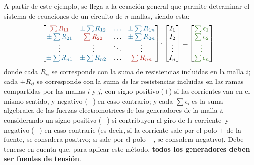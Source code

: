 	A partir de este ejemplo, se llega a la ecuación general que
        permite determinar el sistema de ecuaciones de un circuito de
        $n$ mallas, siendo esta:
	\begin{equation*}
          \begin{bmatrix}
            {\color{BrickRed}\sum R_{11}} &  {\color{MidnightBlue}\pm\sum R_{12}} & {\color{MidnightBlue}{\dots}} & {\color{MidnightBlue}\pm\sum R_{1n}} \\
            {\color{MidnightBlue}\pm\sum R_{21}} & {\color{BrickRed}\sum R_{22}} & {{\dots}} & {\color{MidnightBlue}\pm\sum R_{2n}} \\
            {\vdots} & {\vdots} &  {\ddots} & \vdots\\
            {\color{MidnightBlue}\pm\sum R_{n1}} & {\color{MidnightBlue}\pm\sum R_{n2}} & \dots & {\color{BrickRed}\sum R_{nn}}
          \end{bmatrix} \cdot 
          \begin{bmatrix}
            I_1\\
            I_2\\
            \vdots\\
            I_n
          \end{bmatrix} = %
          \begin{bmatrix}
            {\color{OliveGreen}\sum\epsilon_1}\\
            {\color{OliveGreen}\sum\epsilon_2}\\
            {\color{OliveGreen}\vdots}\\
            {\color{OliveGreen}\sum\epsilon_n}
          \end{bmatrix}
	\end{equation*}
	donde cada {\color{BrickRed}$R_{ii}$} se corresponde con la
        suma de resistencias incluidas en la malla $i$; cada
        {\color{MidnightBlue}$\pm R_{ij}$} se corresponde con la suma de las
        resistencias incluidas en las ramas compartidas por las mallas
        $i$ y $j$, con signo positivo ($+$) si las corrientes van en
        el mismo sentido, y negativo ($-$) en caso contrario; y cada
        {\color{OliveGreen} $\sum \epsilon_i$} es la suma algebraica de
        las fuerzas electromotrices de los generadores de la malla
        $i$, considerando un signo positivo ($+$) si contribuyen al
        giro de la corriente, y negativo ($-$) en caso contrario (es
        decir, si la corriente sale por el polo $+$ de la fuente, se
        considera positivo; si sale por el polo $-$, se considera
        negativo). Debe tenerse en cuenta que, para aplicar este
        método, \textbf{todos los generadores deben ser fuentes de
          tensión}.
	
